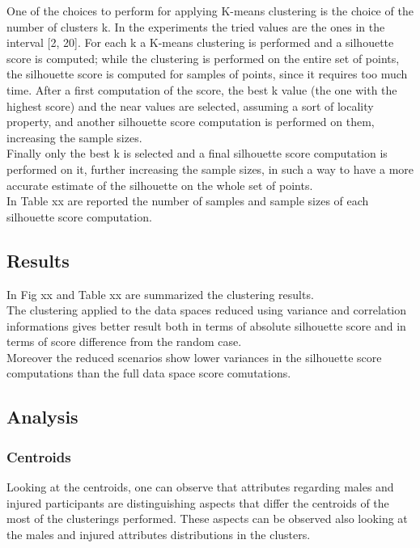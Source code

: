One of the choices to perform for applying K-means clustering is the choice of the number of clusters k. In the experiments the tried values are the ones in the interval [2, 20]. For each k a K-means clustering is performed and a silhouette score is computed; while the clustering is performed on the entire set of points, the silhouette score is computed for samples of points, since it requires too much time. After a first computation of the score, the best k value (the one with the highest score) and the near values are selected, assuming a sort of locality property, and another silhouette score computation is performed on them, increasing the sample sizes.\\
Finally only the best k is selected and a final silhouette score computation is performed on it, further increasing the sample sizes, in such a way to have a more accurate estimate of the silhouette on the whole set of points.\\
In Table xx are reported the number of samples and sample sizes of each silhouette score computation.\\

\subsection{Results}

In Fig xx and Table xx are summarized the clustering results.\\
The clustering applied to the data spaces reduced using variance and correlation informations gives better result both in terms of absolute silhouette score and in terms of score difference from the random case.\\
Moreover the reduced scenarios show lower variances in the silhouette score computations than the full data space score comutations.

\subsection{Analysis}

\subsubsection{Centroids}

Looking at the centroids, one can observe that attributes regarding males and injured participants are distinguishing aspects that differ the centroids of the most of the clusterings performed. These aspects can be observed also looking at the males and injured attributes distributions in the clusters.

